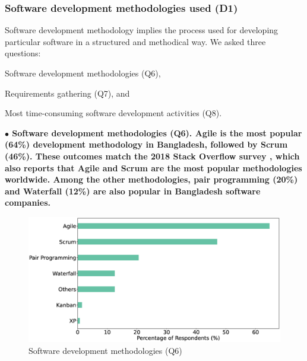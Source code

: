 \subsubsection{Software development methodologies used (D1)}
\label{methodology}

Software development methodology implies the process used for developing
particular software in a structured and methodical
way. We asked three questions: \begin{inparaenum}
\item Software development methodologies (Q6),
\item Requirements gathering (Q7), and
\item Most time-consuming software development activities (Q8).
\end{inparaenum}

\nd\bf{$\bullet$ Software development methodologies (Q6).} Agile is the most popular (64\%) development methodology in Bangladesh, followed by Scrum (46\%). These outcomes match the 2018 Stack Overflow
survey \citep{StackoverflowSurvey2018}, which also reports that Agile and Scrum
are the most popular methodologies worldwide. Among the other methodologies, 
pair programming (20\%) and Waterfall (12\%) are also popular in Bangladesh software companies.
\begin{figure}[h]
\centering
  \includegraphics[scale=0.18]{Figures/Respondents_Methodology}
  \caption{Software development methodologies (Q6)}
  \label{fig:methodologies}
\end{figure}

